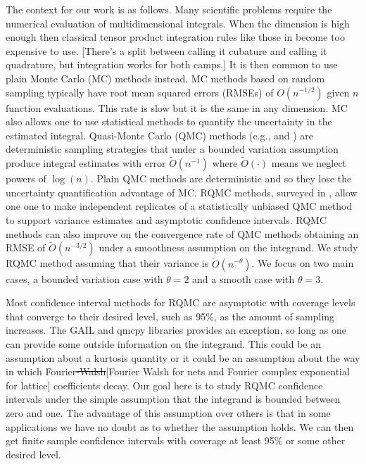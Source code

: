 \documentclass{article}
\newcommand{\art}[1]{\begingroup\color{blue}#1\endgroup}
\newcommand{\fred}[1]{\begingroup\color{red}#1\endgroup}
\begin{document}
The context for our work is as follows.
Many scientific problems require the numerical 
evaluation of multidimensional
integrals. When the dimension is high enough then classical \fred{tensor product \art{integration}} rules 
like those in \cite{DavRab84} become too expensive to use.
\art{[There's a split between calling it cubature and calling
it quadrature, but integration works for both camps.]}
It is then
common to use plain Monte Carlo (MC) methods instead.  MC
methods based on random sampling typically have root mean
squared errors (RMSEs) of $O(n^{-1/2})$ given $n$
function evaluations.  This rate is slow but it is the
same in any dimension.  MC also allows one to use statistical
methods to quantify the uncertainty in the estimated
integral.  Quasi-Monte Carlo (QMC) 
methods (e.g.,  \cite{DicPil10a} and \cite{Nie92}) are deterministic
sampling strategies that under a bounded variation assumption
produce integral estimates with error $\tilde O(n^{-1})$ where
$\tilde O(\cdot)$ means we neglect powers of $\log(n)$.
Plain QMC methods are deterministic and so they lose the
uncertainty quantification advantage of MC. RQMC methods, 
surveyed in \cite{LEcLem02a}, allow one
one to make independent replicates of a statistically
unbiased QMC method to support variance estimates and
asymptotic confidence intervals.  RQMC methods can also
improve on the convergence rate of QMC methods obtaining
an RMSE of $\tilde O(n^{-3/2})$ under a smoothness assumption
\cite{Owe97,Owe08a} on the integrand.  We study RQMC
method assuming that their variance is $\tilde O(n^{-\theta})$.
We focus on two main cases, a bounded variation case with
$\theta=2$ and a smooth case with $\theta=3$.

Most confidence interval methods for RQMC are asymptotic
with coverage levels that converge to their desired level,
such as 95\%, as the amount of sampling increases.  The GAIL \fred{\cite{Gail_ug} and qmcpy \cite{QMCPy2020a} } libraries provides an exception, so long as one can
provide some outside information on the integrand.  This could
be an assumption about a kurtosis quantity or it could be
an assumption about the way  in which Fourier\fred{\sout{-Walsh}[Fourier Walsh for nets and Fourier complex exponential for lattice]} coefficients
decay.  Our goal here is to study RQMC confidence intervals
under the simple assumption that the integrand is bounded between
zero and one.  The advantage of this assumption over others is 
that in some applications we have no doubt as to whether the
assumption holds. We can then get finite sample confidence
intervals with coverage at least 95\% or some other desired level.
\end{document}
